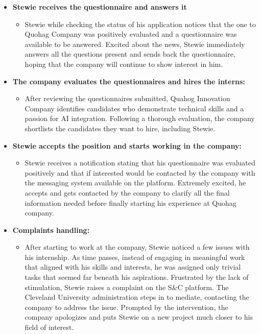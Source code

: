 \begin{itemize}[leftmargin=*, label={}]
    \item \textbf{Stewie receives the questionnaire and answers it}
    \begin{itemize}
        \item Stewie while checking the status of his application notices that the one to Quohag Company was positively evaluated and a questionnaire was available to be answered. Excited about the news, Stewie immediately answers all the questions present and sends back the questionnaire, hoping that the company will continue to show interest in him. 
    \end{itemize}

    \item \textbf{The company evaluates the questionnaires and hires the interns:}
    \begin{itemize}
        \item After reviewing the questionnaires submitted, Quahog Innovation Company identifies candidates who demonstrate technical skills and a passion for AI integration. Following a thorough evaluation, the company shortlists the candidates they want to hire, including Stewie.
    \end{itemize}

    \item \textbf{Stewie accepts the position and starts working in the company:}
    \begin{itemize}
        \item Stewie receives a notification stating that his questionnaire was evaluated positively and that if interested would be contacted by the company with the messaging system available on the platform. Extremely excited, he accepts and gets contacted by the company to clarify all the final information needed before finally starting his experience at Quohag company.
    \end{itemize}

    \item \textbf{Complaints handling:}
    \begin{itemize}
        \item After starting to work at the company, Stewie noticed a few issues with his internship. As time passes, instead of engaging in meaningful work that aligned with his skills and interests, he was assigned only trivial tasks that seemed far beneath his aspirations. Frustrated by the lack of stimulation, Stewie raises a complaint on the S\&C platform. The Cleveland University administration steps in to mediate, contacting the company to address the issue. Prompted by the intervention, the company apologizes and puts Stewie on a new project much closer to his field of interest.
    \end{itemize}
        

\end{itemize}
